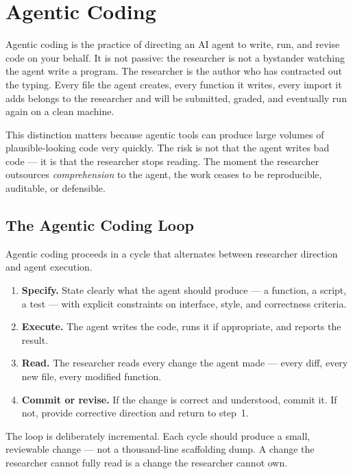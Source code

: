 \chapter{Agentic Coding}
\label{chapter:AgenticCoding}

Agentic coding is the practice of directing an AI agent to write, run, and revise code on your behalf.
It is not passive: the researcher is not a bystander watching the agent write a program.
The researcher is the author who has contracted out the typing.
Every file the agent creates, every function it writes, every import it adds belongs to the researcher and will be submitted, graded, and eventually run again on a clean machine.

This distinction matters because agentic tools can produce large volumes of plausible-looking code very quickly.
The risk is not that the agent writes bad code — it is that the researcher stops reading.
The moment the researcher outsources \emph{comprehension} to the agent, the work ceases to be reproducible, auditable, or defensible.

\section{The Agentic Coding Loop}
\label{section:AgenticCodingLoop}

Agentic coding proceeds in a cycle that alternates between researcher direction and agent execution.

\begin{enumerate}
\item \textbf{Specify.} State clearly what the agent should produce — a function, a script, a test — with explicit constraints on interface, style, and correctness criteria.
\item \textbf{Execute.} The agent writes the code, runs it if appropriate, and reports the result.
\item \textbf{Read.} The researcher reads every change the agent made — every diff, every new file, every modified function.
\item \textbf{Commit or revise.} If the change is correct and understood, commit it. If not, provide corrective direction and return to step~1.
\end{enumerate}

The loop is deliberately incremental.
Each cycle should produce a small, reviewable change — not a thousand-line scaffolding dump.
A change the researcher cannot fully read is a change the researcher cannot own.

